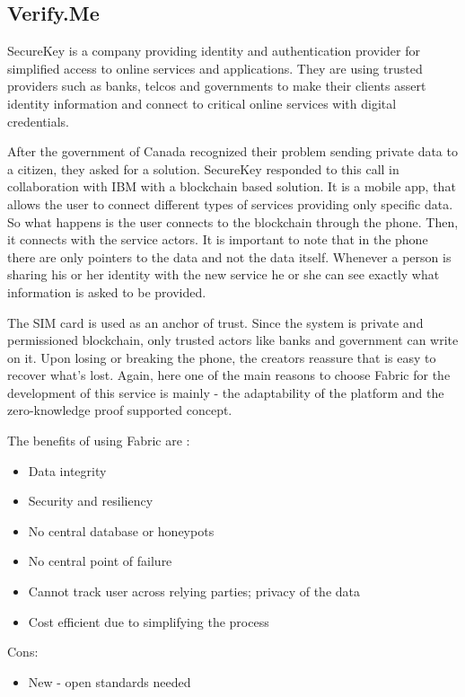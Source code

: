 \documentclass[a4paper,11pt]{report}
\begin{document}
\subsection{Verify.Me}
\label{verifyMe}
SecureKey is a company providing identity and authentication provider for simplified access to online services and applications. They are using trusted providers such as banks, telcos and governments to make their clients assert identity information and connect to critical online services with digital credentials.

After the government of Canada recognized their problem sending private data to a citizen, they asked for a solution. SecureKey responded to this call in collaboration with IBM with a blockchain based solution. It is a mobile app, that allows the user to connect different types of services providing only specific data. So what happens is the user connects to the blockchain through the phone. Then, it connects with the service actors. It is important to note that in the phone there are only pointers to the data and not the data itself. Whenever a person is sharing his or her identity with the new service he or she can see exactly what information is asked to be provided. \cite{verifyMe}

	The SIM card is used as an anchor of trust. Since the system is
private and permissioned blockchain, only trusted actors like banks and government can write on it. Upon losing or breaking the phone, the creators reassure that is easy to recover what’s lost. 
Again, here one of the main reasons to choose Fabric for the development of this service is mainly - the adaptability of the platform and the zero-knowledge proof supported concept. \cite{verifyMeDemo}

The benefits of using Fabric are : 
\begin{itemize}
\item Data integrity 
\item Security and resiliency
\item No central database or honeypots 
\item No central point of failure
\item Cannot track user across relying parties; privacy of the data
\item Cost efficient due to simplifying the process
\end{itemize}
Cons: 
\begin{itemize}
\item New - open standards needed 
\end{itemize}
\end{document}
